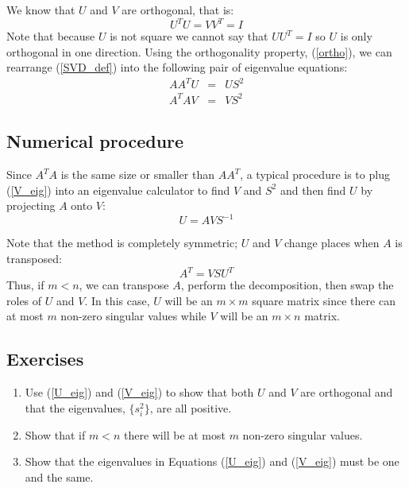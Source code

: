 \documentclass{article}
\begin{document}
We know that $U$ and $V$ are orthogonal, that is:
\begin{equation}
U^T U = V V^T = I
\label{ortho}
\end{equation}
Note that because $U$ is not square we cannot say that $U U^T=I$ so $U$ is 
only orthogonal in one direction.
Using the orthogonality property, (\ref{ortho}), we can rearrange (\ref{SVD_def}) into the following pair of eigenvalue
equations:
\begin{eqnarray}
A A^T U & = & U S^2 \label{U_eig} \\
A^T A V & = & V S^2 \label{V_eig}
\end{eqnarray}


\subsection{Numerical procedure}

Since $A^T A$ is the same size or smaller than $A A^T$, a typical procedure
is to plug (\ref{V_eig}) into an eigenvalue calculator to find $V$ and 
$S^2$ and then find $U$ by projecting $A$ onto $V$:
\begin{equation}
U = A V S^{-1}
\label{finding_U}
\end{equation}

Note that the method is completely symmetric; $U$ and $V$ change places
when $A$ is transposed:
\begin{equation}
A^T = V S U^T
\end{equation}
Thus, if $m < n$, we can transpose $A$, perform the decomposition, then
swap the roles of $U$ and $V$.
In this case, $U$ will be an $m \times m$ square matrix since there can 
at most $m$ non-zero singular values while $V$ will be an $m \times n$ matrix.

\subsection{Exercises}

\begin{enumerate}
	\item Use (\ref{U_eig}) and (\ref{V_eig}) to show that both $U$ and $V$ 
are orthogonal and that the eigenvalues, $\lbrace s_i^2 \rbrace$, are all positive.
\item Show that if $m < n$
there will be at most $m$ non-zero singular values.
\item Show that the eigenvalues in Equations (\ref{U_eig}) and 
(\ref{V_eig}) must be one and the same.
\end{enumerate}
\end{document}
